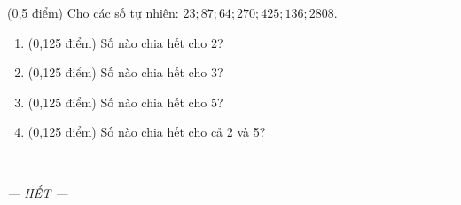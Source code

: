 \documentclass[12pt,a4paper]{article}
\begin{document}
\begin{ex} (0,5 điểm)
Cho các số tự nhiên: $23; 87; 64; 270; 425; 136; 2808$.
\begin{enumerate}[label=\textbf{\alph*)}, leftmargin=0.8cm, itemsep=2pt]
\item (0,125 điểm) Số nào chia hết cho 2?
\item (0,125 điểm) Số nào chia hết cho 3?
\item (0,125 điểm) Số nào chia hết cho 5?
\item (0,125 điểm) Số nào chia hết cho cả 2 và 5?
\end{enumerate}
\end{ex}
\vspace{1.5mm}


\begin{center}
\rule{4cm}{0.4pt}\\
\textit{--- HẾT ---}
\end{center}
\end{document}
